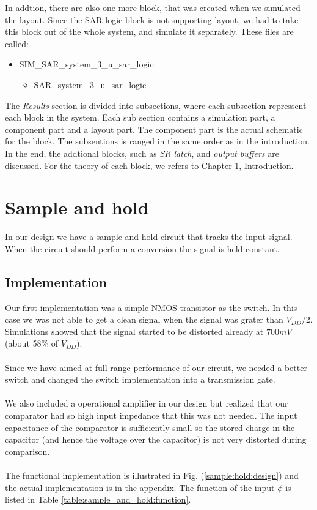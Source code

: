 \documentclass[english, 12pt, a4paper]{ifimaster}
\begin{document}
In addtion, there are also one more block, that was created when we simulated the layout. Since the SAR logic block is not supporting layout, we had to take this block out of the whole system, 
and simulate it separately. These files are called:
\begin{itemize}
 \item SIM\_SAR\_system\_3\_u\_sar\_logic
 \begin{itemize}
  \item SAR\_system\_3\_u\_sar\_logic
 \end{itemize}
\end{itemize}
The \textit{Results} section is divided into subsections, where each subsection repressent each block in the system. Each sub section contains a simulation part, a component part and a layout part. 
The component part is the actual schematic for the block. The subsentions is ranged in the same order as in the introduction. In the end, the addtional blocks, such as \textit{SR latch}, and 
\textit{output buffers} are discussed. For the theory of each block, we refers to Chapter 1, Introduction. 

\section{Sample and hold}
In our design we have a sample and hold circuit that tracks the input signal. When the circuit should perform a conversion the signal is held constant.

\subsection{Implementation}
Our first implementation was a simple NMOS transistor as the switch. In this case we was not able to get a clean signal when the signal was grater than \(V_{DD}\)/2. 
Simulations showed that the signal started to be distorted already at \(700 mV\) (about 58\% of \(V_{DD}\)).\\
\\
Since we have aimed at full range performance of our circuit, we needed a better switch and changed the switch implementation into a transmission gate. \\
\\
We also included a operational amplifier in our design but realized that our comparator had so high input impedance that this was not needed. The input capacitance of the 
comparator is sufficiently small so the stored charge in the capacitor (and hence the voltage over the capacitor) is not very distorted during comparison.\\
\\
The functional implementation is illustrated in Fig. (\ref{sample:hold:design}) and the actual implementation is in the appendix. 
The function of the input \(\phi\) is listed in Table \ref{table:sample_and_hold:function}.
\end{document}
